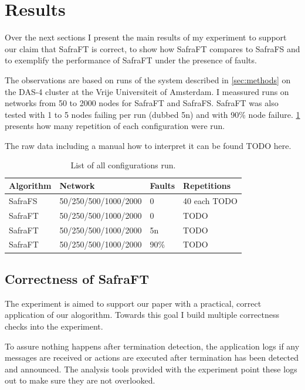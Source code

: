 \section{Results}
\label{sec:results}
Over the next sections I present the main results of my experiment to support our claim that SafraFT is correct, to show how SafraFT compares to SafraFS and to exemplify the performance of SafraFT under the presence of faults.

The observations are based on runs of the system described in \cref{sec:methods} on the DAS-4 cluster at the Vrije Universiteit of Amsterdam.
I meassured runs on networks from 50 to 2000 nodes for SafraFT and SafraFS.
SafraFT was also tested with 1 to 5 nodes failing per run (dubbed 5n) and with 90\% node failure.
\cref{table:runs} presents how many repetition of each configuration were run.

The raw data including a manual how to interpret it can be found TODO here.
\begin{table}[]
	\centering
	\begin{tabular}{@{}llll@{}}
		\toprule
		Algorithm & Network              & Faults & Repetitions  \\ \midrule
		SafraFS   & 50/250/500/1000/2000 & 0      & 40 each TODO \\
		SafraFT   & 50/250/500/1000/2000 & 0      & TODO         \\
		SafraFT   & 50/250/500/1000/2000 & 5n     & TODO         \\
		SafraFT   & 50/250/500/1000/2000 & 90\%   & TODO         \\ \bottomrule
	\end{tabular}
	\label{table:runs}
	\caption{List of all configurations run.}
\end{table}

\subsection{Correctness of SafraFT}
\label{ssec:correctness}
The experiment is aimed to support our paper with a practical, correct application of our alogorithm.
Towards this goal I build multiple correctness checks into the experiment. 

To assure nothing happens after termination detection, the application logs if any messages are received or actions are executed after termination has been detected and announced. 
The analysis tools provided with the experiment point these logs out to make sure they are not overlooked.

